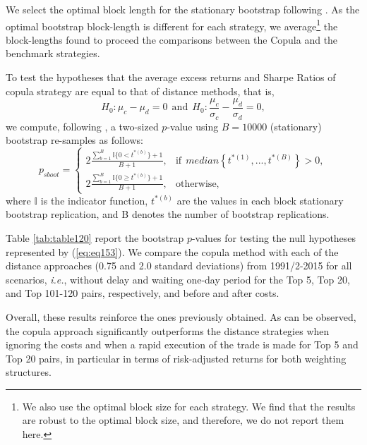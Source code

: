 \documentclass[a4paper]{article}
\begin{document}
	We select the optimal block length for the stationary bootstrap following \citet*{pw04}. As the optimal bootstrap block-length is different for each strategy, we average\footnote{We also use the optimal block size for each strategy. We find that the results are robust to the optimal block size, and therefore, we do not report them here.} the block-lengths found to proceed the comparisons between the Copula and the benchmark strategies.
	
	To test the hypotheses that the average excess returns and Sharpe Ratios of copula strategy are equal to that of distance methods, that is,
	\begin{equation}
	H_{0}:\mu_{c}-\mu_{d}=0  \ \ \textrm{and}
	\ \  H_{0}:\frac{\mu_{c}}{\sigma_{c}}-\frac{\mu_{d}}{\sigma_{d}}=0,
	\label{eq:eq153}
	\end{equation}
	we compute, following \citet*{davison1997}, a two-sized $p$-value using $B=10000$ (stationary) bootstrap re-samples as follows:
	\begin{equation}
	p_{sboot}=
	\begin{cases}
	2\frac{\sum_{b=1}^{B}\mathbb{I}\{0< t^{\ast(b)}\}+1}{B+1}, &\text{if} ~~median\left\{ t^{\ast \left( 1\right) },...,t^{\ast \left( B\right)}\right\} > 0, \\
	2\frac{\sum_{b=1}^{B}\mathbb{I}\{0\geq t^{\ast(b)}\}+1}{B+1}, &\text{otherwise},
	\end{cases}
	\label{eq:eq152}
	\end{equation}
	where $\mathbb{I}$ is the indicator function, $t^{\ast(b)}$ are the values in each block stationary bootstrap replication, and B denotes the number of bootstrap replications.
	
	Table \ref{tab:table120} report the bootstrap $p$-values for testing the null hypotheses represented by (\ref{eq:eq153}). We compare the copula method with each of the distance approaches (0.75 and 2.0 standard deviations) from 1991/2-2015 for all scenarios, \emph{i.e.}, without delay and waiting one-day period for the Top 5, Top 20, and Top 101-120 pairs, respectively, and before and after costs.
	
	Overall, these results reinforce the ones previously obtained. As can be observed, the copula approach significantly outperforms the distance strategies when ignoring the costs and when a rapid execution of the trade is made for Top 5 and Top 20 pairs, in particular in terms of risk-adjusted returns for both weighting structures.

	
\end{document}
